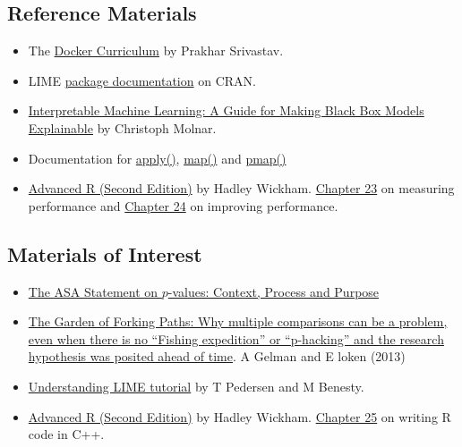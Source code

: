 \documentclass[
  12pt,
]{book}
\begin{document}
\hypertarget{reference-materials-2}{%
\subsection*{Reference Materials}\label{reference-materials-2}}

\begin{itemize}
\item
  The \href{https://docker-curriculum.com/}{Docker Curriculum} by Prakhar Srivastav.
\item
  LIME \href{https://cran.r-project.org/web/packages/lime/index.html}{package documentation} on CRAN.
\item
  \href{https://christophm.github.io/interpretable-ml-book/}{Interpretable Machine Learning: A Guide for Making Black Box Models Explainable} by Christoph Molnar.
\item
  Documentation for \href{https://www.rdocumentation.org/packages/base/versions/3.6.2/topics/apply}{apply()}, \href{https://purrr.tidyverse.org/reference/map.html}{map()} and \href{https://furrr.futureverse.org/}{pmap()}
\item
  \href{https://adv-r.hadley.nz/index.html}{Advanced R (Second Edition)} by Hadley Wickham. \href{https://adv-r.hadley.nz/perf-measure.html}{Chapter 23} on measuring performance and \href{https://adv-r.hadley.nz/perf-improve.html}{Chapter 24} on improving performance.
\end{itemize}

\hypertarget{materials-of-interest-3}{%
\subsection*{Materials of Interest}\label{materials-of-interest-3}}

\begin{itemize}
\item
  \href{https://library-search.imperial.ac.uk/discovery/fulldisplay?docid=cdi_informaworld_taylorfrancis_310_1080_00031305_2016_1154108\&context=PC\&vid=44IMP_INST:ICL_VU1\&lang=en\&search_scope=MyInst_and_CI\&adaptor=Primo\%20Central\&tab=Everything\&query=any,contains,ASA\%20p-value\&offset=0}{The ASA Statement on \(p\)-values: Context, Process and Purpose}
\item
  \href{http://stat.columbia.edu/~gelman/research/unpublished/forking.pdf}{The Garden of Forking Paths: Why multiple comparisons can be a problem,
  even when there is no ``Fishing expedition'' or ``p-hacking'' and the research
  hypothesis was posited ahead of time}. A Gelman and E loken (2013)
\item
  \href{https://cran.r-project.org/web/packages/lime/vignettes/Understanding_lime.html}{Understanding LIME tutorial} by T Pedersen and M Benesty.
\item
  \href{https://adv-r.hadley.nz/index.html}{Advanced R (Second Edition)} by Hadley Wickham. \href{https://adv-r.hadley.nz/rcpp.html}{Chapter 25} on writing R code in C++.
\end{itemize}
\end{document}
